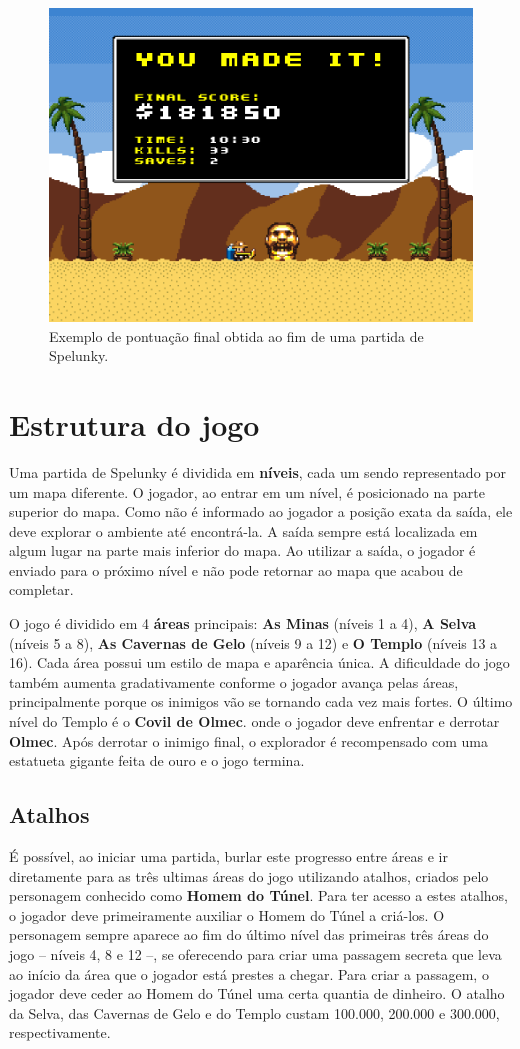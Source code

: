 \begin{figure}[htb!]
\centering
\includegraphics[width=.65\textwidth]{fig/spelunky-score.png}
\caption{\label{fig:spelunky-scores}Exemplo de pontuação final obtida ao fim de
uma partida de Spelunky.}
\end{figure}


\section{\label{section:spelunky-structure}Estrutura do jogo}
Uma partida de Spelunky é dividida em \textbf{níveis}, cada um sendo
representado por um mapa diferente. O jogador, ao entrar em um nível, é
posicionado na parte superior do mapa. Como não é informado ao jogador a posição
exata da saída, ele deve explorar o ambiente até encontrá-la. A saída sempre
está localizada em algum lugar na parte mais inferior do mapa. Ao utilizar a
saída, o jogador é enviado para o próximo nível e não pode retornar ao mapa que
acabou de completar.

O jogo é dividido em 4 \textbf{áreas} principais: \textbf{As Minas} (níveis 1 a
4), \textbf{A Selva} (níveis 5 a 8), \textbf{As Cavernas de Gelo} (níveis 9 a
12) e \textbf{O Templo} (níveis 13 a 16). Cada área possui um estilo de mapa e
aparência única. A dificuldade do jogo também aumenta gradativamente conforme o
jogador avança pelas áreas, principalmente porque os inimigos vão se tornando
cada vez mais fortes. O último nível do Templo é o \textbf{Covil de Olmec}. onde
o jogador deve enfrentar e derrotar \textbf{Olmec}. Após derrotar o inimigo
final, o explorador é recompensado com uma estatueta gigante feita de ouro e o
jogo termina.


\subsection{Atalhos}
É possível, ao iniciar uma partida, burlar este progresso entre áreas e ir
diretamente para as três ultimas áreas do jogo utilizando atalhos, criados pelo
personagem conhecido como \textbf{Homem do Túnel}. Para ter acesso a estes
atalhos, o jogador deve primeiramente auxiliar o Homem do Túnel a criá-los. O
personagem sempre aparece ao fim do último nível das primeiras três áreas do
jogo -- níveis 4, 8 e 12 --, se oferecendo para criar uma passagem secreta que
leva ao início da área que o jogador está prestes a chegar. Para criar a
passagem, o jogador deve ceder ao Homem do Túnel uma certa quantia de dinheiro.
O atalho da Selva, das Cavernas de Gelo e do Templo custam 100.000, 200.000 e
300.000, respectivamente.


